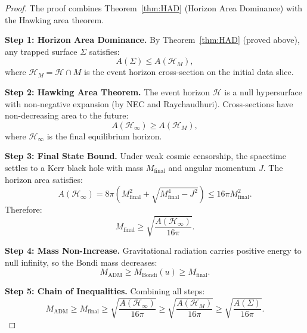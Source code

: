 \begin{proof}
The proof combines Theorem~\ref{thm:HAD} (Horizon Area Dominance) with the Hawking area theorem.

\textbf{Step 1: Horizon Area Dominance.}
By Theorem~\ref{thm:HAD} (proved above), any trapped surface $\Sigma$ satisfies:
\begin{equation}
    A(\Sigma) \le A(\mathcal{H}_M),
\end{equation}
where $\mathcal{H}_M = \mathcal{H} \cap M$ is the event horizon cross-section on the initial data slice.

\textbf{Step 2: Hawking Area Theorem.}
The event horizon $\mathcal{H}$ is a null hypersurface with non-negative expansion (by NEC and Raychaudhuri). Cross-sections have non-decreasing area to the future:
\begin{equation}
    A(\mathcal{H}_\infty) \ge A(\mathcal{H}_M),
\end{equation}
where $\mathcal{H}_\infty$ is the final equilibrium horizon.

\textbf{Step 3: Final State Bound.}
Under weak cosmic censorship, the spacetime settles to a Kerr black hole with mass $M_{\text{final}}$ and angular momentum $J$. The horizon area satisfies:
\begin{equation}
    A(\mathcal{H}_\infty) = 8\pi\left( M_{\text{final}}^2 + \sqrt{M_{\text{final}}^4 - J^2} \right) \le 16\pi M_{\text{final}}^2.
\end{equation}
Therefore:
\begin{equation}
    M_{\text{final}} \ge \sqrt{\frac{A(\mathcal{H}_\infty)}{16\pi}}.
\end{equation}

\textbf{Step 4: Mass Non-Increase.}
Gravitational radiation carries positive energy to null infinity, so the Bondi mass decreases:
\begin{equation}
    M_{\mathrm{ADM}} \ge M_{\text{Bondi}}(u) \ge M_{\text{final}}.
\end{equation}

\textbf{Step 5: Chain of Inequalities.}
Combining all steps:
\begin{equation}
    M_{\mathrm{ADM}} \ge M_{\text{final}} \ge \sqrt{\frac{A(\mathcal{H}_\infty)}{16\pi}} \ge \sqrt{\frac{A(\mathcal{H}_M)}{16\pi}} \ge \sqrt{\frac{A(\Sigma)}{16\pi}}.
\end{equation}
\end{proof}


